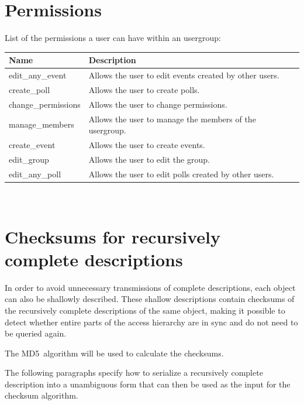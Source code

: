 \documentclass[parskip=full,11pt]{scrartcl}
\begin{document}


\updateType{}{
		\apiArgument{
            -/-/-
		}
}

\section{Permissions}
List of the permissions a user can have within an usergroup:

\begin{tabular}{l|l}
    \hline
    \textbf{Name} & \textbf{Description} \\
    \hline
        edit\_any\_event & Allows the user to edit events created by other
        users. \\
        create\_poll & Allows the user to create polls. \\
        change\_permissions & Allows the user to change permissions. \\
        manage\_members & Allows the user to manage the members of the
        usergroup. \\
        create\_event & Allows the user to create events. \\
        edit\_group & Allows the user to edit the group. \\
        edit\_any\_poll & Allows the user to edit polls created by other
        users. \\
\end{tabular}\\




\section{Checksums for recursively complete descriptions}\label{sec:checksum}
\newcommand{\hashAlg}{MD5}
In order to avoid unnecessary transmissions of complete descriptions, each
object can also be shallowly described.
These shallow descriptions contain checksums of the recursively complete
descriptions of the same object, making it possible to detect whether entire
parts of the access hierarchy are in sync and do not need to be queried again.

\par The \hashAlg~algorithm will be used to calculate the checksums.

\par The following paragraphs specify how to serialize a recursively complete
description into a unambiguous form that can then be used as the input for the
checksum algorithm.
\end{document}
